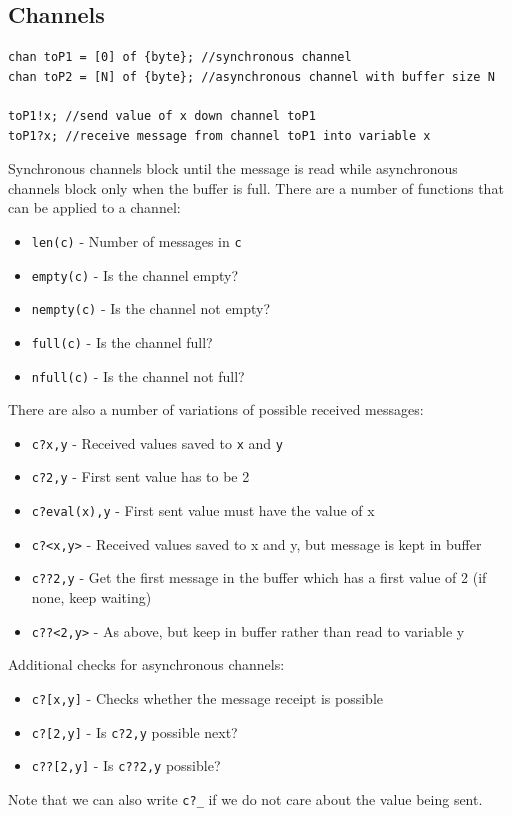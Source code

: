 \documentclass[11pt]{article}
\theoremstyle{definition}
\begin{document}
\subsection{Channels}
\begin{lstlisting}[caption={Channel definition}]
chan toP1 = [0] of {byte}; //synchronous channel
chan toP2 = [N] of {byte}; //asynchronous channel with buffer size N

toP1!x; //send value of x down channel toP1
toP1?x; //receive message from channel toP1 into variable x
\end{lstlisting}
Synchronous channels block until the message is read while asynchronous channels block only when the buffer is full. 
\n
There are a number of functions that can be applied to a channel:
\begin{itemize}
\item \texttt{len(c)} - Number of messages in \texttt{c}
\item \texttt{empty(c)} - Is the channel empty?
\item \texttt{nempty(c)} - Is the channel not empty?
\item \texttt{full(c)} - Is the channel full?
\item \texttt{nfull(c)} - Is the channel not full?
\end{itemize}
There are also a number of variations of possible received messages:
\begin{itemize}
\item \texttt{c?x,y} - Received values saved to \texttt{x} and \texttt{y}
\item \texttt{c?2,y} - First sent value has to be 2
\item \texttt{c?eval(x),y} - First sent value must have the value of x
\item \texttt{c?<x,y>} - Received values saved to x and y, but message is kept in buffer
\item \texttt{c??2,y} - Get the first message in the buffer which has a first value of 2 (if none, keep waiting)
\item \texttt{c??<2,y>} - As above, but keep in buffer rather than read to variable y
\end{itemize}
Additional checks for asynchronous channels:
\begin{itemize}
\item \texttt{c?[x,y]} - Checks whether the message receipt is possible
\item \texttt{c?[2,y]} - Is \texttt{c?2,y} possible next?
\item \texttt{c??[2,y]} - Is \texttt{c??2,y} possible?
\end{itemize}
Note that we can also write \texttt{c?\_} if we do not care about the value being sent.
\end{document}
